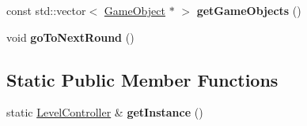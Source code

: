 \begin{DoxyCompactItemize}
\item 
\hypertarget{class_level_controller_a331dc36b48234e99d07a6db68e700297}{const std\+::vector$<$ \hyperlink{class_game_object}{Game\+Object} $\ast$ $>$ {\bfseries get\+Game\+Objects} ()}\label{class_level_controller_a331dc36b48234e99d07a6db68e700297}

\item 
\hypertarget{class_level_controller_a77c7be37cbb30dc3ff6574c053562260}{void {\bfseries go\+To\+Next\+Round} ()}\label{class_level_controller_a77c7be37cbb30dc3ff6574c053562260}

\end{DoxyCompactItemize}
\subsection*{Static Public Member Functions}
\begin{DoxyCompactItemize}
\item 
\hypertarget{class_level_controller_aff1d9aba9f9fb043e644cc4c01869b7f}{static \hyperlink{class_level_controller}{Level\+Controller} \& {\bfseries get\+Instance} ()}\label{class_level_controller_aff1d9aba9f9fb043e644cc4c01869b7f}

\end{DoxyCompactItemize}
